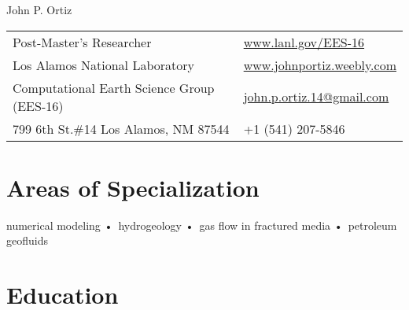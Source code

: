 \documentclass[11pt, letterpaper]{article}
\def\doubleline{

	\vspace{-1.4em}
	\hspace{\fill}\linethickness{0.7pt}\line(1,0){5.5in}\hspace{\fill}
	
	\vspace{-1.0em}
	\hspace{\fill}\linethickness{0.7pt}\line(1,0){5.5in}\hspace{\fill}
	
}
\begin{document}
{\LARGE John P. Ortiz} %




\begin{center}
	\begin{tabular}{l l}
		Post-Master's Researcher    & \hspace{.5in}\href{www.lanl.gov/EES-16}{www.lanl.gov/EES-16} \\
		Los Alamos National Laboratory   & \hspace{.5in}\href{www.johnportiz.weebly.com}{www.johnportiz.weebly.com}   \\
		Computational Earth Science Group (EES-16)       & \hspace{.5in}\Letter {     } \href{mailto:john.p.ortiz.14@gmail.com}{john.p.ortiz.14@gmail.com}    \\ 
		799 6th St.\#14  Los Alamos, NM 87544 & \hspace{.5in}\Mobilefone { } +1 (541) 207-5846  \\
		
	\end{tabular}
\end{center}


\section*{Areas of Specialization}
	numerical modeling •\ hydrogeology •\ gas flow in fractured media •\ petroleum geofluids
	

\section*{Education}
\noindent
\end{document}

